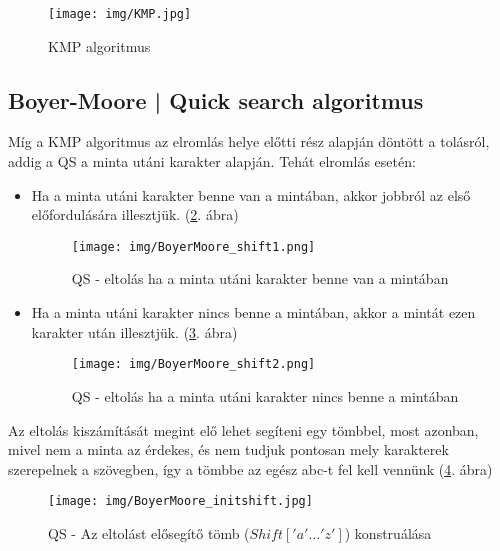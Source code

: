 \documentclass[margin=0px]{article}
\begin{document}
\begin{figure}[H]
    \centering
    \texttt{[image: img/KMP.jpg]}
    \caption{KMP algoritmus}
    \label{fig:KMP}
\end{figure}
\subsection{Boyer-Moore  | Quick search algoritmus}
Míg a KMP algoritmus az elromlás helye előtti rész alapján döntött a tolásról, addig a QS a minta utáni karakter alapján. Tehát elromlás esetén:
\begin{itemize}
    \item Ha a minta utáni karakter benne van a mintában, akkor jobbról az első előfordulására illesztjük. (\ref{fig:BoyerMoore_shift1}. ábra)
          \begin{figure}[H]
              \centering
              \texttt{[image: img/BoyerMoore\_shift1.png]}
              \caption{QS - eltolás ha a minta utáni karakter benne van a mintában}
              \label{fig:BoyerMoore_shift1}
          \end{figure}
    \item Ha a minta utáni karakter nincs benne a mintában, akkor a mintát ezen karakter után illesztjük. (\ref{fig:BoyerMoore_shift2}. ábra)
          \begin{figure}[H]
              \centering
              \texttt{[image: img/BoyerMoore\_shift2.png]}
              \caption{QS - eltolás ha a minta utáni karakter nincs benne a mintában}
              \label{fig:BoyerMoore_shift2}
          \end{figure}
\end{itemize}

Az eltolás kiszámítását megint elő lehet segíteni egy tömbbel, most azonban, mivel nem a minta az érdekes, és nem tudjuk pontosan mely karakterek szerepelnek a szövegben, így a tömbbe az egész abc-t fel kell vennünk (\ref{fig:BoyerMoore_initshift}. ábra)

\begin{figure}[H]
    \centering
    \texttt{[image: img/BoyerMoore\_initshift.jpg]}
    \caption{QS - Az eltolást elősegítő tömb ($Shift['a'...'z']$) konstruálása}
    \label{fig:BoyerMoore_initshift}
\end{figure}
\end{document}
